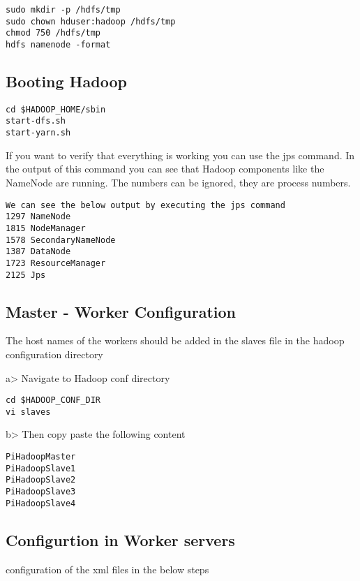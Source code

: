 \begin{lstlisting}
sudo mkdir -p /hdfs/tmp 
sudo chown hduser:hadoop /hdfs/tmp 
chmod 750 /hdfs/tmp 
hdfs namenode -format 
\end{lstlisting}

\subsection{Booting Hadoop}

\begin{lstlisting}
cd $HADOOP_HOME/sbin 
start-dfs.sh 
start-yarn.sh 
\end{lstlisting}

If you want to verify that everything is working you can use the jps
command. In the output of this command you can see that Hadoop
components like the NameNode are running. The numbers can be ignored,
they are process numbers.

\begin{lstlisting}
We can see the below output by executing the jps command 
1297 NameNode
1815 NodeManager
1578 SecondaryNameNode
1387 DataNode
1723 ResourceManager
2125 Jps
\end{lstlisting}

\subsection{Master - Worker Configuration}

The host names of the workers should be added in the slaves file in the
hadoop configuration directory

a\textgreater{} Navigate to Hadoop conf directory

\begin{lstlisting}
cd $HADOOP_CONF_DIR
vi slaves 
\end{lstlisting}

b\textgreater{} Then copy paste the following content

\begin{lstlisting}
PiHadoopMaster
PiHadoopSlave1
PiHadoopSlave2
PiHadoopSlave3
PiHadoopSlave4
\end{lstlisting}

\subsection{Configurtion in Worker servers}

configuration of the xml files in the below steps

